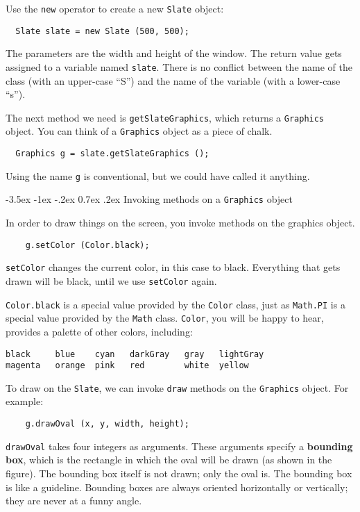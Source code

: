 \documentclass{book}
\makeatletter
\renewcommand{\section}{\@startsection 
    {section} {1} {0mm}%
    {-3.5ex \@plus -1ex \@minus -.2ex}%
    {0.7ex \@plus.2ex}%
    {\normalfont\Large\bfseries}}
\makeatother
\begin{document}
Use the {\tt new} operator to create a new {\tt Slate} object:

\begin{verbatim}
  Slate slate = new Slate (500, 500);
\end{verbatim}
%
The parameters are the width and height of the window.  The return
value gets assigned to a variable named {\tt slate}.  There is no
conflict between the name of the class (with an upper-case ``S'') and
the name of the variable (with a lower-case ``s'').

The next method we need is {\tt getSlateGraphics}, which 
returns a {\tt Graphics} object.
You can think of a {\tt Graphics} object as a piece of chalk.

\begin{verbatim}
  Graphics g = slate.getSlateGraphics ();
\end{verbatim}
%
Using the name {\tt g} is conventional, but we could have called it
anything.


\section{Invoking methods on a {\tt Graphics} object}

In order to draw things on the screen, you invoke methods on the
graphics object.  

\begin{verbatim}
    g.setColor (Color.black);
\end{verbatim}
%
{\tt setColor} changes the current color, in this case to
black.  Everything that gets drawn will be black, until we
use {\tt setColor} again.

{\tt Color.black} is a special value provided by the {\tt Color}
class, just as {\tt Math.PI} is a special value provided by the
{\tt Math} class.  {\tt Color}, you will be happy to hear, provides a
palette of other colors, including:

\begin{verbatim}
black     blue    cyan   darkGray   gray   lightGray
magenta	  orange  pink   red        white  yellow
\end{verbatim}
%
To draw on the {\tt Slate}, we can invoke {\tt draw} methods
on the {\tt Graphics} object.  For example:

\begin{verbatim}
    g.drawOval (x, y, width, height);
\end{verbatim}
%
{\tt drawOval} takes four integers as arguments.
These arguments specify a {\bf bounding box}, which is the rectangle
in which the oval will be drawn (as shown in the figure).  The
bounding box itself is not drawn; only the oval is.  The bounding box
is like a guideline.  Bounding boxes are always oriented horizontally
or vertically; they are never at a funny angle.
\end{document}
